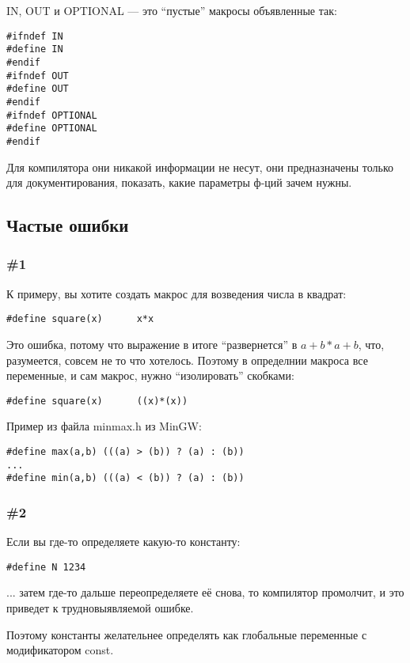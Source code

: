 IN, OUT и OPTIONAL --- это ``пустые'' макросы объявленные так:

\begin{lstlisting}
#ifndef IN
#define IN
#endif
#ifndef OUT
#define OUT
#endif
#ifndef OPTIONAL
#define OPTIONAL
#endif
\end{lstlisting}

Для компилятора они никакой информации не несут, они предназначены только для документирования, показать,
какие параметры ф-ций зачем нужны.

\subsection{Частые ошибки}

\subsubsection{\#1}

К примеру, вы хотите создать макрос для возведения числа в квадрат:

\begin{lstlisting}
#define square(x)      x*x
\end{lstlisting}

Это ошибка, потому что выражение  в итоге ``развернется'' в $a+b*a+b$, что, разумеется, совсем
не то что хотелось. Поэтому в определнии макроса все переменные, и сам макрос, нужно ``изолировать'' скобками:

\begin{lstlisting}
#define square(x)      ((x)*(x))
\end{lstlisting}

Пример из файла minmax.h из MinGW:

\begin{lstlisting}
#define max(a,b) (((a) > (b)) ? (a) : (b))
...
#define min(a,b) (((a) < (b)) ? (a) : (b))
\end{lstlisting}

\subsubsection{\#2}

Если вы где-то определяете какую-то константу:

\begin{lstlisting}
#define N 1234
\end{lstlisting}

... затем где-то дальше переопределяете её снова, то компилятор промолчит, и это приведет к трудновыявляемой
ошибке.

Поэтому константы желательнее определять как глобальные переменные с модификатором const.

